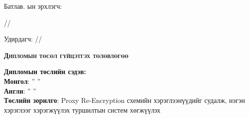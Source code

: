 
\begin{titlepage}

\noindent Батлав. \deptname ын эрхлэгч: 
\begin{flushright}
\makebox[6cm]{\dotfill} /\chairname/ 
\end{flushright} 
Удирдагч:\makebox[6cm]{ \dotfill} /\supname/
\begin{center}
\vspace*{0.5cm}
\textbf{{\large \textsc{Дипломын төсөл гүйцэтгэх төлөвлөгөө}}}\\[0.5cm]
\end{center}
\noindent \textbf{Дипломын төслийн сэдэв:}\\
\textbf{Монгол}: '' \ttitle '' \\
\textbf{Англи}: '' \ttitleng ''\\

\noindent \textbf{Төслийн зорилго}: Proxy Re-Encryption схемийн хэрэглээнүүдийг судалж, нэгэн хэрэглээг хэрэгжүүлэх туршилтын систем хөгжүүлэх\\
 

\end{titlepage}
